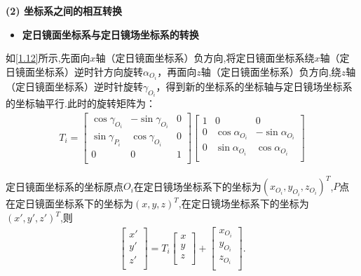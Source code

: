 \documentclass[../main.tex]{subfiles}
\begin{document}
\par \textbf{(2) 坐标系之间的相互转换}
\begin{itemize}
\item \textbf{定日镜面坐标系与定日镜场坐标系的转换}
\end{itemize}
\par 如\cref{1.12}所示,先面向$x$轴（定日镜面坐标系）负方向,将定日镜面坐标系绕$x$轴（定日镜面坐标系）逆时针方向旋转$\alpha _{O_i}$，再面向$z$轴（定日镜面坐标系）负方向,绕\(z\)轴（定日镜面坐标系）逆时针旋转$\gamma_{O_i}$，得到新的坐标系的坐标轴与定日镜场坐标系的坐标轴平行.此时的旋转矩阵为：
\begin{align}\label{1.15}
T_i=\left[ \begin{matrix}
\cos \gamma _{O_i}&		-\sin \gamma _{O_i}&		0\\
\sin \gamma _{P_i}&		\cos \gamma _{O_i}&		0\\
0&		0&		1\\
\end{matrix} \right] \left[ \begin{matrix}
1&		0&		0\\
0&		\cos \alpha _{O_i}&		-\sin \alpha _{O_i}\\
0&		\sin \alpha _{O_i}&		\cos \alpha _{O_i}\\
\end{matrix} \right] 
\end{align}
\par 定日镜面坐标系的坐标原点$O_i$在定日镜场坐标系下的坐标为$(x_{O_i},y_{O_i},z_{O_i})^T$,$P$点在定日镜面坐标系下的坐标为$(x,y,z)^T$,在定日镜场坐标系下的坐标为$(x',y',z')^T$,则
\begin{align}\label{eq:100.1}
\left[ \begin{matrix}
x'\\
y'\\
z'\\
\end{matrix} \right] =T_i\left[ \begin{matrix}
x\\
y\\
z\\
\end{matrix} \right]+\left[ \begin{matrix}
x_{O_i}\\
y_{O_i}\\
z_{O_i}\\
\end{matrix} \right].
\end{align}
\end{document}

